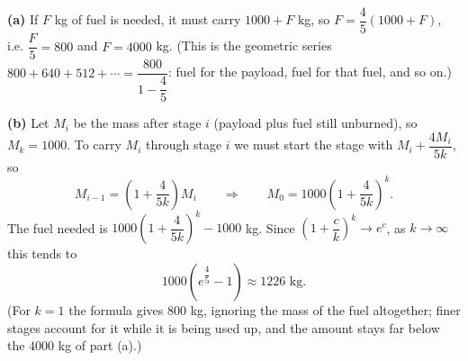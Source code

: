 \textbf{(a)} If $F$ kg of fuel is needed, it must carry $1000+F$ kg, so $F=\dfrac45(1000+F)$, i.e. $\dfrac F5=800$ and $F=\boxed{4000}$ kg. (This is the geometric series $800+640+512+\cdots=\dfrac{800}{1-\dfrac45}$: fuel for the payload, fuel for that fuel, and so on.)

\textbf{(b)} Let $M_i$ be the mass after stage $i$ (payload plus fuel still unburned), so $M_k=1000$. To carry $M_i$ through stage $i$ we must start the stage with $M_i+\dfrac{4M_i}{5k}$, so
\[M_{i-1}=\left(1+\dfrac{4}{5k}\right)M_i\qquad\Longrightarrow\qquad M_0=1000\left(1+\dfrac{4}{5k}\right)^k.\]
The fuel needed is $1000\left(1+\dfrac{4}{5k}\right)^k-1000$ kg. Since $\left(1+\dfrac{c}{k}\right)^k\to e^c$, as $k\to\infty$ this tends to
\[\boxed{1000\left(e^{\dfrac45}-1\right)\approx1226\text{ kg}}.\]
(For $k=1$ the formula gives $800$ kg, ignoring the mass of the fuel altogether; finer stages account for it while it is being used up, and the amount stays far below the $4000$ kg of part (a).)
